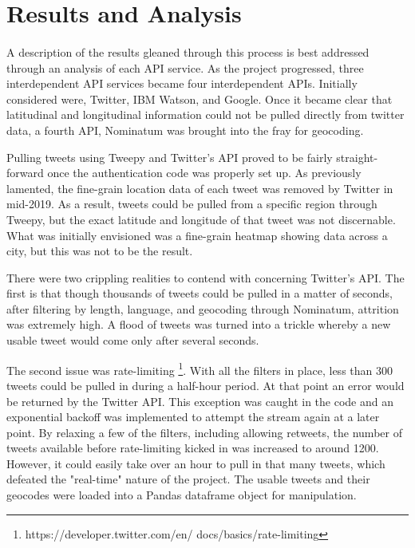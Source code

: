 \documentclass[12pt, oneside]{article}
\begin{document}
\section{Results and Analysis}
\paragraph{}
A description of the results gleaned through this process is best addressed
through an analysis of each API service. As the project progressed, three
interdependent API services became four interdependent APIs. Initially
considered were, Twitter, IBM Watson, and Google. Once it became clear that
latitudinal and longitudinal information could not be pulled directly from
twitter data, a fourth API, Nominatum was brought into the fray for geocoding.

Pulling tweets using Tweepy and Twitter's API proved to be fairly straight-
forward once the authentication code was properly set up. As previously
lamented, the fine-grain location data of each tweet was removed
by Twitter in mid-2019. As a result, tweets could be pulled from a specific
region through Tweepy, but the exact latitude and longitude of that
tweet was not discernable. What was initially envisioned was a fine-grain
heatmap showing data across a city, but this was not to be the result.

There were two crippling realities to contend with concerning Twitter's API. The
first is that though thousands of tweets could be pulled in a matter of
seconds, after filtering by length, language, and geocoding through Nominatum,
attrition was extremely high. A flood of tweets was turned into a trickle
whereby a new usable tweet would come only after several seconds.

The second issue was rate-limiting \footnote{https://developer.twitter.com/en/
docs/basics/rate-limiting}. With all the filters in place, less than 300 tweets
could be pulled in during a half-hour period. At that point an error would be
returned by the Twitter API. This exception was caught in the code and an
exponential backoff was implemented to attempt the stream again at a later
point. By relaxing a few of the filters, including allowing retweets, the
number of tweets available before rate-limiting kicked in was increased to
around 1200. However, it could easily take over an hour to pull in that many
tweets,
which defeated the "real-time" nature of the project. The usable tweets and
their geocodes were loaded into a
Pandas dataframe object for manipulation.
\end{document}
